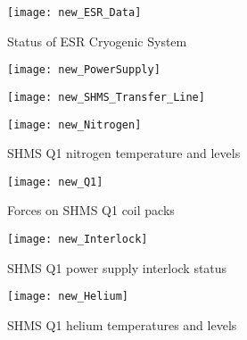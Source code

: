 \begin{figure}
\begin{center}
\texttt{[image: new\_ESR\_Data]}
\caption{\label{fig:magc_ESR_Data}Status of ESR Cryogenic System}
\end{center}
\end{figure}


\begin{figure}
\begin{center}
\texttt{[image: new\_PowerSupply]}
\caption{\label{fig:magc_PowerSupply}}
\end{center}
\end{figure}


\begin{figure}
\begin{center}
\texttt{[image: new\_SHMS\_Transfer\_Line]}
\caption{\label{fig:magc_SHMS_Transfer_Line}}
\end{center}
\end{figure}


\begin{figure}
\begin{center}
\texttt{[image: new\_Nitrogen]}
\caption{\label{fig:magc_Nitrogen}SHMS Q1 nitrogen temperature and levels}
\end{center}
\end{figure}


\begin{figure}
\begin{center}
\texttt{[image: new\_Q1]}
\caption{\label{fig:magc_q1}Forces on SHMS Q1 coil packs}
\end{center}
\end{figure}


\begin{figure}
\begin{center}
\texttt{[image: new\_Interlock]}
\caption{\label{fig:magc_Interlock}SHMS Q1 power supply interlock status}
\end{center}
\end{figure}


\begin{figure}
\begin{center}
\texttt{[image: new\_Helium]}
\caption{\label{fig:magc_Helium}SHMS Q1 helium temperatures and levels}
\end{center}
\end{figure}

